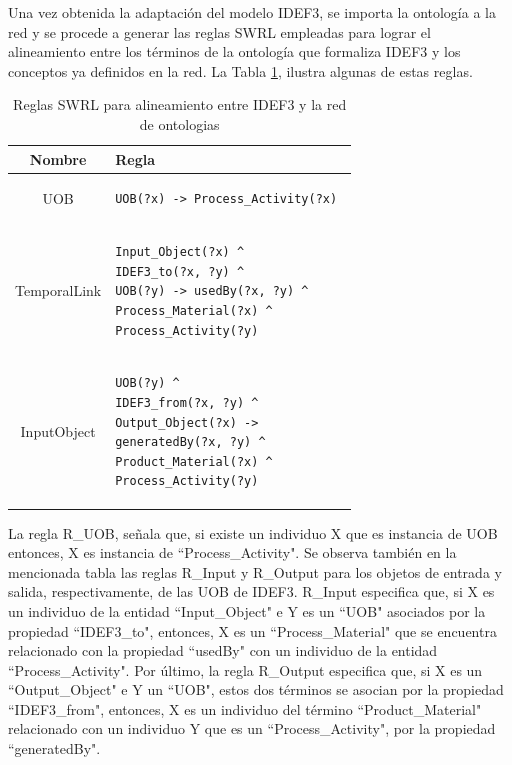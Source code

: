 \documentclass[journal]{IEEEtran}
\begin{document}
Una vez obtenida la adaptaci\'on del modelo IDEF3, se importa la ontolog\'ia a la red y se procede a generar las reglas SWRL empleadas para lograr el alineamiento entre los t\'erminos de la ontolog\'ia que formaliza IDEF3 y los conceptos ya definidos en la red. La Tabla \ref{tabla8}, ilustra algunas de estas reglas.

\begin{table}[!t]
\renewcommand{\arraystretch}{1.3}
\caption{Reglas SWRL para alineamiento entre IDEF3 y la red de ontologias}
\label{tabla8}
\centering
\begin{tabular}{|c|p{6cm}|}
\hline
\bfseries Nombre & \bfseries Regla \\ \hline
UOB          & \begin{verbatim}UOB(?x) -> Process_Activity(?x) \end{verbatim} \\ \cline{1-2}
TemporalLink & \begin{verbatim}Input_Object(?x) ^ 
IDEF3_to(?x, ?y) ^ 
UOB(?y) -> usedBy(?x, ?y) ^ 
Process_Material(?x) ^ 
Process_Activity(?y) \end{verbatim} \\ \cline{1-2}
InputObject  & \begin{verbatim}UOB(?y) ^ 
IDEF3_from(?x, ?y) ^ 
Output_Object(?x) -> 
generatedBy(?x, ?y) ^  
Product_Material(?x) ^ 
Process_Activity(?y) \end{verbatim} \\ \hline   
\end{tabular}
\end{table}

La regla R\_UOB, señala que, si existe un individuo X que es instancia de UOB entonces, X es instancia de ``Process\_Activity". Se observa tambi\'en en la mencionada tabla las reglas R\_Input y R\_Output para los objetos de entrada y salida, respectivamente, de las UOB de IDEF3. R\_Input especifica que, si X es un individuo de la entidad ``Input\_Object" e Y es un ``UOB" asociados por la propiedad ``IDEF3\_to", entonces, X es un ``Process\_Material" que se encuentra relacionado con la propiedad ``usedBy" con un individuo de la entidad ``Process\_Activity". Por \'ultimo, la regla R\_Output especifica que, si X es un ``Output\_Object" e Y un ``UOB", estos dos t\'erminos se asocian por la propiedad ``IDEF3\_from", entonces, X es un individuo del t\'ermino ``Product\_Material" relacionado con un individuo Y que es un ``Process\_Activity", por la propiedad ``generatedBy".
\end{document}
